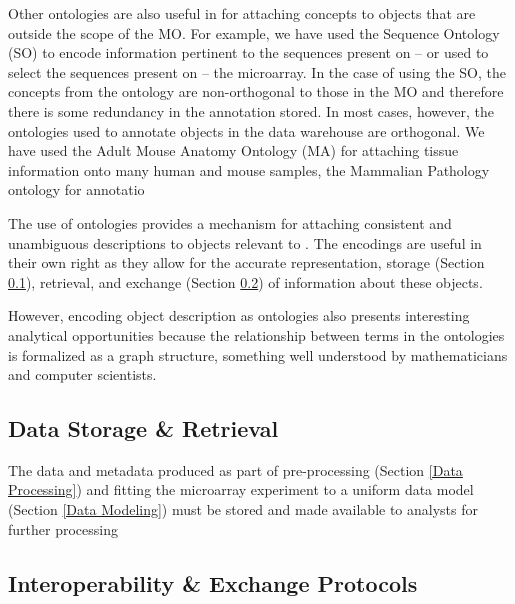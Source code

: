Other ontologies are also useful in \dbthesis for attaching concepts to objects
that are outside the scope of the MO.  For example, we have used the Sequence
Ontology (SO) \cite{so} to encode information pertinent to the sequences
present on -- or used to select the sequences present on -- the microarray.  In
the case of using the SO, the concepts from the ontology are non-orthogonal to
those in the MO and therefore there is some redundancy in the annotation
stored.  In most cases, however, the ontologies used to annotate objects in the
data warehouse are orthogonal.  We have used the Adult Mouse Anatomy Ontology
(MA) \cite{ma} for attaching tissue information onto many human and mouse
samples, the Mammalian Pathology ontology for annotatio

The use of ontologies provides a mechanism for attaching consistent and
unambiguous descriptions to objects relevant to \dbthesis.  The encodings are useful
in their own right as they allow for the accurate representation, storage
(Section \ref{Storage}), retrieval, and exchange (Section \ref{Protocol}) of
information about these objects.

However, encoding object description as ontologies also presents interesting
analytical opportunities because the relationship between terms in the
ontologies is formalized as a graph structure, something well understood by
mathematicians and computer scientists.


\subsection{Data Storage \& Retrieval}
\label{Storage}

The data and metadata produced as part of pre-processing (Section \ref{Data
Processing}) and fitting the microarray experiment to a uniform data model
(Section \ref{Data Modeling}) must be stored and made available to analysts for
further processing

\subsection{Interoperability \& Exchange Protocols}
\label{Protocol}

